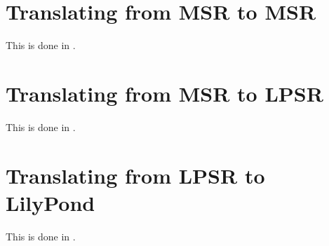 \section{Translating from MSR to MSR}

This is done in \msrToMsr{}.


\section{Translating from MSR to LPSR}

This is done in \msrToLpsr{}.


\section{Translating from LPSR to LilyPond}

This is done in \lpsrToLilypond{}.


